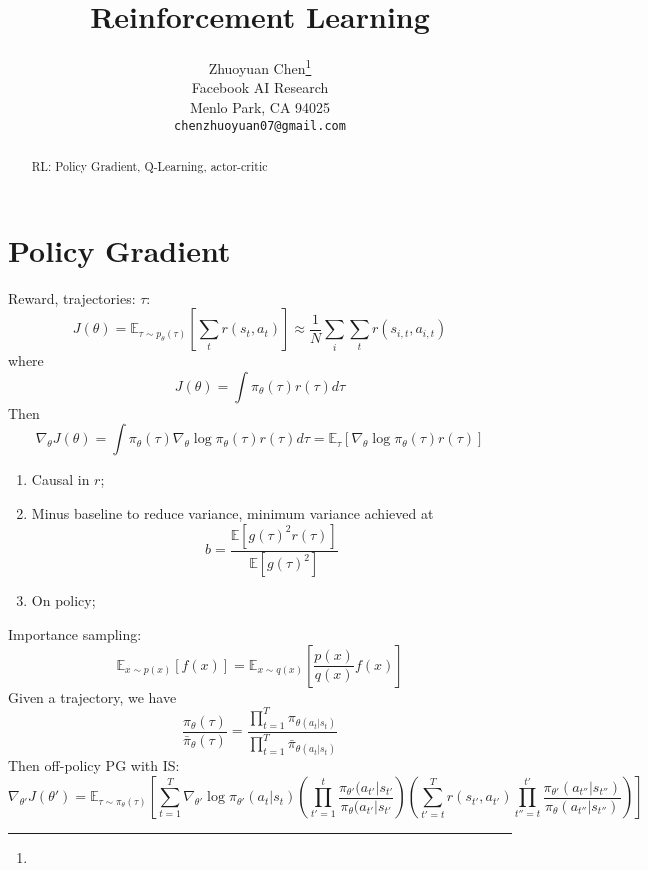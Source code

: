 \documentclass{article}
\title{Reinforcement Learning}
\author{%
  Zhuoyuan Chen\thanks{}\\%
  Facebook AI Research\\
  Menlo Park, CA 94025 \\
  \texttt{chenzhuoyuan07@gmail.com} \\
}
\begin{document}

\maketitle

\begin{abstract}
RL: Policy Gradient, Q-Learning, actor-critic
\end{abstract}

\section{Policy Gradient}
Reward, trajectories: $\tau$:
\begin{equation}
J(\theta)=\mathbb{E}_{\tau\sim p_{\theta}(\tau)}[\sum_t r(s_t, a_t)]\approx \frac{1}{N}\sum_i\sum_t r(s_{i,t}, a_{i,t})
\end{equation}
where
\begin{equation*}
J(\theta) = \int \pi_{\theta}(\tau)r(\tau)d\tau
\end{equation*}
Then
\begin{equation*}
\nabla_{\theta}J(\theta) = \int \pi_{\theta}(\tau)\nabla_{\theta}\log\pi_{\theta}(\tau) r(\tau)d\tau=\mathbb{E}_{\tau}[\nabla_{\theta}\log\pi_{\theta}(\tau)r(\tau)]
\end{equation*}
\begin{enumerate}
\item Causal in $r$;
\item Minus baseline to reduce variance, minimum variance achieved at
\begin{equation*}
b = \frac{\mathbb{E}[g(\tau)^2r(\tau)]}{\mathbb{E}[g(\tau)^2]}
\end{equation*}
\item On policy;
\end{enumerate}
Importance sampling:
\begin{equation*}
\mathbb{E}_{x\sim p(x)}[f(x)] = \mathbb{E}_{x\sim q(x)}[\frac{p(x)}{q(x)}f(x)]
\end{equation*}
Given a trajectory,  we have
\begin{equation*}
\frac{\pi_{\theta}(\tau)}{\bar{\pi}_{\theta}(\tau)}=\frac{\prod_{t=1}^T\pi_{\theta(a_t|s_t)}}{\prod_{t=1}^T\bar{\pi}_{\theta(a_t|s_t)}}
\end{equation*}
Then off-policy PG with IS:
\begin{equation}
\nabla_{\theta'}J(\theta')=\mathbb{E}_{\tau\sim\pi_{\theta}(\tau)}[\sum_{t=1}^T\nabla_{\theta'}\log\pi_{\theta'}(a_t|s_t)
(\prod_{t'=1}^t\frac{\pi_{\theta'}(a_{t'}|s_{t'}}{\pi_{\theta}(a_{t'}|s_{t'}})
(\sum_{t'=t}^T r(s_{t'}, a_{t'}) \prod_{t''=t}^{t'}
\frac{\pi_{\theta'}(a_{t''}|s_{t''})}{\pi_{\theta}(a_{t''}|s_{t''})})]
\end{equation}
\end{document}
